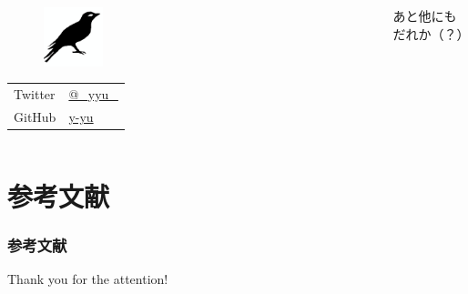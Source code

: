 \begin{frame}
  \begin{columns}
    \begin{column}{0.45\textwidth}
      \begin{center}
        \begin{figure}
          \includegraphics[width=0.2\textwidth]{img/bird2x.png}
        \end{figure}
      \end{center}
 
      \begin{table}[h]
        \begin{tabular}{ll}
          Twitter & \href{https://twitter.com/\_yyu\_}{@\_yyu\_} \\
          GitHub &  \href{https://github.com/y-yu}{y-yu} \\
        \end{tabular}
      \end{table}
    \end{column}
    \begin{column}{0.45\textwidth}
      あと他にもだれか（？）
    \end{column}
  \end{columns}
\end{frame}


\section*{参考文献}
\begin{frame}%
  \frametitle{参考文献}
  
  
\end{frame}

\begin{frame}
  \centering
  {\Huge Thank you for the attention!}
\end{frame}


